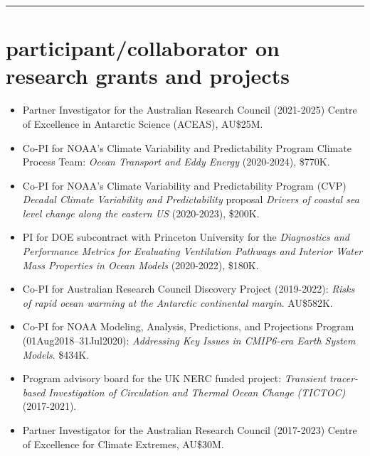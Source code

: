 \documentclass{article}
\begin{document}



\noindent\rule{\textwidth}{1pt}
\vspace{-1cm}
\section*{\sc \color{Maroon}  participant/collaborator on research grants and projects}
\vspace{-.3cm}

\begin{itemize}[leftmargin=*]

\item Partner Investigator for the Australian Research Council (2021-2025) Centre of Excellence in Antarctic Science (ACEAS), AU\$25M.
  
\item Co-PI for NOAA's Climate Variability and Predictability Program Climate Process Team: {\it Ocean Transport and Eddy Energy} (2020-2024), \$770K.

\item Co-PI for NOAA's Climate Variability and Predictability Program (CVP) {\it Decadal Climate Variability and Predictability} proposal {\it Drivers of coastal sea level change along the eastern US} (2020-2023), \$200K.  

\item PI for DOE subcontract with Princeton University for the {\it Diagnostics and Performance Metrics for Evaluating Ventilation Pathways and Interior Water Mass Properties in Ocean Models} (2020-2022), \$180K. 

\item Co-PI for Australian Research Council Discovery Project (2019-2022): {\it Risks of rapid ocean warming at the Antarctic continental margin}. AU\$582K.

\item Co-PI for NOAA Modeling, Analysis, Predictions, and Projections Program (01Aug2018--31Jul2020): {\it Addressing Key Issues in CMIP6-era Earth System Models}. \$434K.
    
\item Program advisory board for the UK NERC funded project: {\it Transient tracer-based Investigation of Circulation and Thermal Ocean Change (TICTOC)} (2017-2021).

\item Partner Investigator for the Australian Research Council (2017-2023) Centre of Excellence for Climate Extremes, AU\$30M.
  

\end{itemize}
\end{document}
